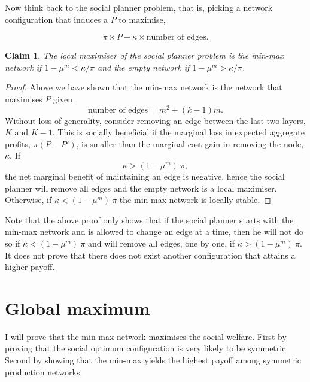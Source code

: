 \documentclass[american, abstract=on]{scrartcl}
\theoremstyle{plain}
\newtheorem{claim}{Claim}
\begin{document}
Now think back to the social planner problem, that is, picking a network configuration that induces a $P$ to maximise,

\begin{equation}
    \pi \times P - \kappa \times \text{number of edges}.
\end{equation}

\begin{claim}
    The local maximiser of the social planner problem is the min-max network if $1 - \mu^m < \kappa / \pi$ and the empty network if $1 - \mu^m > \kappa / \pi$.
\end{claim}

\begin{proof}
    Above we have shown that the min-max network is the network that maximises $P$ given \begin{equation}
        \text{number of edges} = m^2 + (k - 1) m.
    \end{equation}
    Without loss of generality, consider removing an edge between the last two layers, $K$ and $K - 1$. This is socially beneficial if the marginal loss in expected aggregate profits, $\pi (P - P')$, is smaller than the marginal cost gain in removing the node, $\kappa$. If \begin{equation}
        \kappa > (1 - \mu^m) \ \pi,
    \end{equation} the net marginal benefit of maintaining an edge is negative, hence the social planner will remove all edges and the empty network is a local maximiser. Otherwise, if $\kappa < (1 - \mu^m) \ \pi$ the min-max network is locally stable.
\end{proof}

Note that the above proof only shows that if the social planner starts with the min-max network and is allowed to change an edge at a time, then he will not do so if $\kappa < (1 - \mu^m) \ \pi$ and will remove all edges, one by one, if $\kappa > (1 - \mu^m) \ \pi$. It does not prove that there does not exist another configuration that attains a higher payoff.

\section{Global maximum}

I will prove that the min-max network maximises the social welfare. First by proving that the social optimum configuration is very likely to be symmetric. Second by showing that the min-max yields the highest payoff among symmetric production networks.
\end{document}
